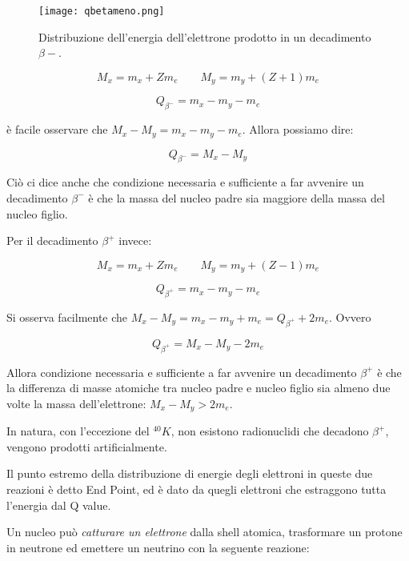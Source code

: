 \documentclass [a4paper, twoside] {book}
\begin{document}
\begin{figure} []
\centering
		\texttt{[image: qbetameno.png]}
		\caption{Distribuzione dell'energia dell'elettrone prodotto in un decadimento $\beta-$.}
         \label{qbetameno}
\end{figure}

\begin{equation}
M_x=m_x+Zm_e 	\qquad M_y=m_y+(Z+1)m_e
\end{equation}

\begin{equation}
Q_{\beta^-}=m_x-m_y-m_e
\end{equation}

è facile osservare che $M_x-M_y=m_x-m_y-m_e$. Allora possiamo dire:

\begin{equation}
Q_{\beta^-}=M_x-M_y
\end{equation}

Ciò ci dice anche che condizione necessaria e sufficiente a far avvenire un decadimento $\beta^-$ è che la massa del nucleo padre sia maggiore della massa del nucleo figlio.

Per il decadimento $\beta^+$ invece:

\begin{equation}
M_x=m_x+Zm_e \qquad M_y=m_y+(Z-1)m_e
\end{equation}

\begin{equation}
Q_{\beta^+}=m_x-m_y-m_e
\end{equation}

Si osserva facilmente che $M_x-M_y=m_x-m_y+m_e=Q_{\beta^+}+2m_e$.
Ovvero

\begin{equation}
Q_{\beta^+}=M_x-M_y-2m_e
\end{equation}

Allora condizione necessaria e sufficiente a far avvenire un decadimento $\beta^+$ è che la differenza di masse atomiche tra nucleo padre e nucleo figlio sia almeno due volte la massa dell'elettrone: $M_x-M_y>2m_e$.

In natura, con l'eccezione del $^{40}K$, non esistono radionuclidi che decadono $\beta^+$, vengono prodotti artificialmente.

Il punto estremo della distribuzione di energie degli elettroni in queste due reazioni è detto End Point, ed è dato da quegli elettroni che estraggono tutta l'energia dal Q value.

Un nucleo può \emph{catturare un elettrone} dalla shell atomica, trasformare un protone in neutrone ed emettere un neutrino con la seguente reazione:
\end{document}
